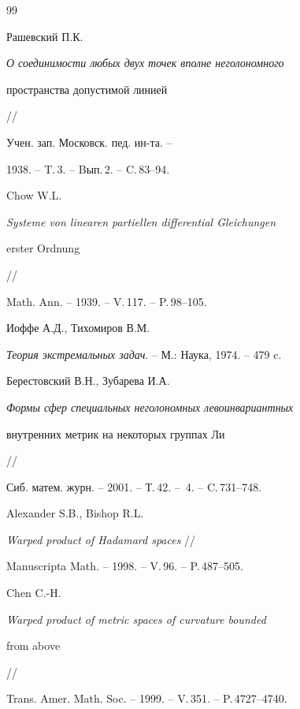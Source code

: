 \begin{thebibliography}{99}


Рашевский П.К.


 {\em О соединимости любых двух точек вполне неголономного


пространства допустимой линией} //


 Учен. зап. Московск. пед. ин-та. --


 1938. -- T.\,3. -- Bып.\,2. -- C.\,83--94.







Chow W.L.


 {\em Systeme von linearen partiellen differential Gleichungen


erster Ordnung} //


 Math. Ann. -- 1939. -- V.\,117. -- P.\,98--105.







Иоффе А.Д., Тихомиров В.М.


 {\em Теория экстремальных задач}. --  М.: Наука, 1974. -- 479 c.







Берестовский В.Н., Зубарева И.А.


 {\em Формы сфер специальных неголономных левоинвариантных


внутренних метрик на некоторых группах Ли} //


 Сиб. матем. журн. -- 2001. -- Т.\,42. -- \No\,4. -- C.\,731--748.







Alexander S.B., Bishop R.L.


 {\em Warped product of Hadamard spaces} //


 Manuscripta Math. -- 1998. -- V.\,96. -- P.\,487--505.







Chen C.-H.


 {\em Warped product of metric spaces of curvature bounded


from above} //


 Trans. Amer. Math. Soc. -- 1999. -- V.\,351. -- P.\,4727--4740.






\end{thebibliography}
